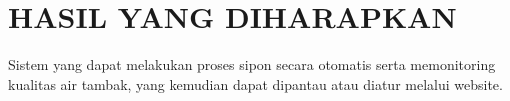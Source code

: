 \section{HASIL YANG DIHARAPKAN}

Sistem yang dapat melakukan proses sipon secara otomatis serta memonitoring kualitas air tambak, yang kemudian dapat dipantau atau diatur melalui website.